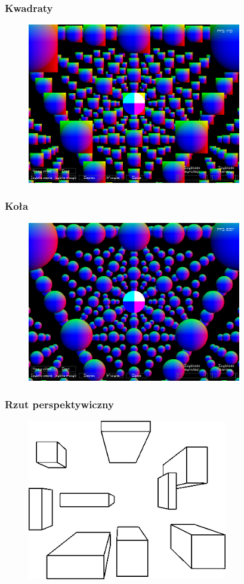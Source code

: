 \documentclass{beamer}
\begin{document}
\frame
{
	\frametitle{Kwadraty}
	\begin{figure}
	\centering
		\includegraphics[height=7cm]{img/orto2.png}
	\label{fig:orto2}
	\end{figure}
	\setcounter{subfigure}{0}
}

\frame
{
	\frametitle{Koła}
	\begin{figure}
	\centering
		\includegraphics[height=7cm]{img/orto3.png}
	\label{fig:orto3}
	\end{figure}
}

\frame
{
	\frametitle{Rzut perspektywiczny}
	\begin{figure}
	\centering
		\includegraphics[height=7cm]{img/per_cube.png}
	\label{fig:perc}
	\end{figure}
}
\end{document}

